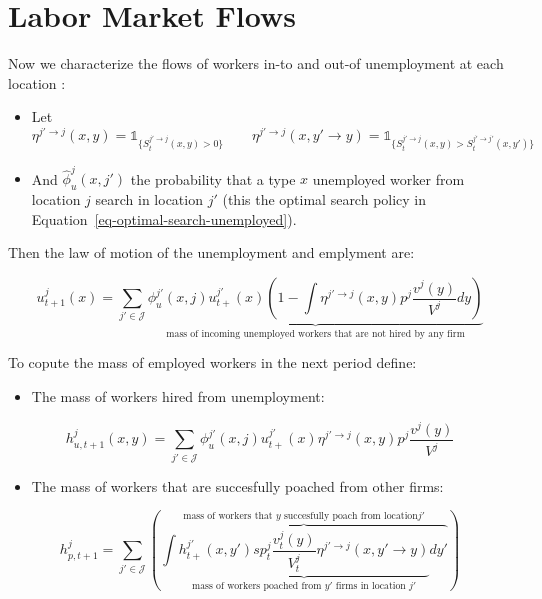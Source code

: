 \documentclass[
  letterpaper,
  DIV=11,
  numbers=noendperiod]{scrreprt}
\providecommand{\tightlist}{%
  \setlength{\itemsep}{0pt}\setlength{\parskip}{0pt}}\usepackage{longtable,booktabs,array}
\begin{document}
\hypertarget{labor-market-flows}{%
\section{Labor Market Flows}\label{labor-market-flows}}

Now we characterize the flows of workers in-to and out-of unemployment
at each location :

\begin{itemize}
\tightlist
\item
  Let
  \[\eta^{j' \to j}(x,y) = \mathbb{1}_{\{S_{t}^{j' \to j}(x,y)>0\}} \qquad \eta^{j' \to j}(x,y'\to y) = \mathbb{1}_{\{S^{j' \to j}_{t}(x,y) > S^{j' \to j'}_{t}(x,y')\}}\]
\item
  And \(\hat{\phi}^j_u(x,j')\) the probability that a type \(x\)
  unemployed worker from location \(j\) search in location \(j'\) (this
  the optimal search policy in
  Equation~\ref{eq-optimal-search-unemployed}).
\end{itemize}

Then the law of motion of the unemployment and emplyment are:

\begin{equation}
u^{j}_{t+1}(x) = \sum_{j'\in \mathcal{J}}\underbrace{\phi_u^{j'}(x,j) u^{j'}_{t+}(x)\left( 1 - \int \eta^{j'\to j}(x,y) p^j\frac{v^j(y)}{V^j}dy \right)}_{\text{mass of incoming unemployed workers that are not hired by any firm}}
\end{equation}

To copute the mass of employed workers in the next period define:

\begin{itemize}
\tightlist
\item
  The mass of workers hired from unemployment:
\end{itemize}

\begin{equation}
h^j_{u, t+1}(x,y) = \sum_{j'\in \mathcal{J}}\phi_u^{j'}(x,j) u^{j'}_{t+}(x)\eta^{j'\to j}(x,y) p^j\frac{v^j(y)}{V^j}
\end{equation}

\begin{itemize}
\tightlist
\item
  The mass of workers that are succesfully poached from other firms:
\end{itemize}

\begin{equation}
h^j_{p, t+1} = \sum_{j'\in \mathcal{J}}\left(\overbrace{\int\underbrace{ h^{j'}_{t+}(x,y')sp^j_t\frac{v^{j}_t(y)}{V^{j}_t}\eta^{j'\to j}(x,y'\to y)}_{\text{mass of workers poached from } y' \text{ firms in location } j'}dy'}^{\text{mass of workers that } y \text{ succesfully poach from location} j'} \right)
\end{equation}
\end{document}
